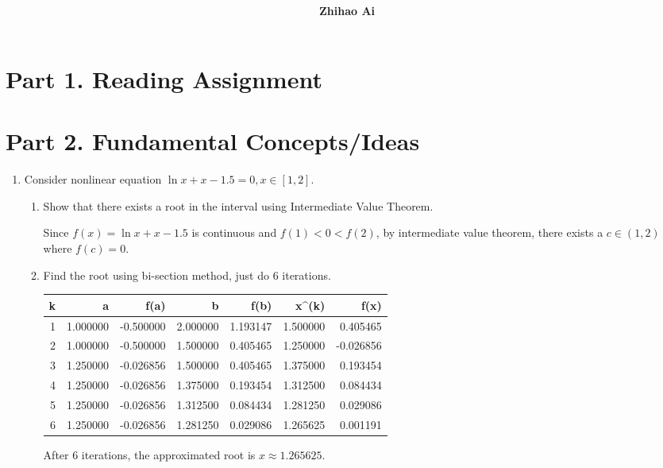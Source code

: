 \documentclass[10pt]{report}
\title{
	\vspace{2in}
	\textmd{\textbf{\hwCourse\\\hwTitle}}\\
	\vspace{0.3in}\large{\textit{\hmwkClassInstructor}}
	\vspace{3in}
}
\author{\textbf{Zhihao Ai}}
\date{}
\begin{document}
\maketitle

\section*{Part 1. Reading Assignment}

\section*{Part 2. Fundamental Concepts/Ideas}
\begin{enumerate}
	\item 
	Consider nonlinear equation $\ln x + x - 1.5 = 0, x\in [1,2]$.
	\begin{enumerate}
		\item 
		Show that there exists a root in the interval using Intermediate Value Theorem.
		
		Since $f(x) = \ln x + x - 1.5$ is continuous and $f(1) < 0 < f(2)$, by intermediate value theorem, there exists a $c\in (1,2)$ where $f(c) = 0$.
		
		\item 
		Find the root using bi-section method, just do 6 iterations.
		\begin{table}[H]
			\centering
			\begin{tabular}{*{7}{N}} \toprule
				k & a & f(a) & b & f(b) & x^{(k)} & f(x) \\  & 1.000000 & -0.500000 & 2.000000 & 1.193147 & 1.500000 & 0.405465\\
				2 & 1.000000 & -0.500000 & 1.500000 & 0.405465 & 1.250000 & -0.026856\\
				3 & 1.250000 & -0.026856 & 1.500000 & 0.405465 & 1.375000 & 0.193454\\
				4 & 1.250000 & -0.026856 & 1.375000 & 0.193454 & 1.312500 & 0.084434\\
				5 & 1.250000 & -0.026856 & 1.312500 & 0.084434 & 1.281250 & 0.029086\\
				6 & 1.250000 & -0.026856 & 1.281250 & 0.029086 & 1.265625 & 0.001191\\
				\bottomrule
			\end{tabular}
		\end{table}
		After 6 iterations, the approximated root is $x\approx 1.265625$.
	\end{enumerate}


\end{enumerate}
\end{document}
